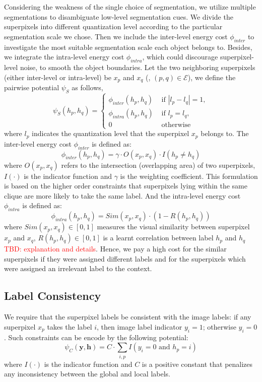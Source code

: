 Considering the weakness of the single choice of segmentation, we utilize multiple segmentations to disambiguate low-level segmentation cues. We divide the superpixels into different quantization level according to the particular segmentation scale we chose. Then we include the inter-level energy cost $\phi_{inter}$ to investigate the most suitable segmentation scale each object belongs to. Besides, we integrate the intra-level energy cost $\phi_{intra}$, which could discourage superpixel-level noise, to smooth the object boundaries. Let the two neighboring superpixels (either inter-level or intra-level) be $x_p$ and $x_q$ (\ie, $(p,q) \in \mathcal{E}$), we define the pairwise potential $\psi_S$ as follows,
\begin{equation}
    \psi_{S}(h_p,h_q) =
    \begin{cases}
        \phi_{inter}(h_p,h_q) &\mbox{ if } | l_p - l_q | = 1,
        \\
        \phi_{intra}(h_p,h_q) &\mbox{ if } l_p = l_q,
        \\
        0 &\mbox{ otherwise }
    \end{cases}
\end{equation}
where $l_p$ indicates the quantization level that the superpixel $x_p$ belongs to.
The inter-level energy cost $\phi_{inter}$ is defined as:
\begin{equation}
    \phi_{inter}(h_p,h_q) = \gamma \cdot O(x_p,x_q) \cdot I(h_p \neq h_q)
\end{equation}
where $O(x_p,x_q)$ refers to the intersection (overlapping area) of two superpixels, $I(\cdot)$ is the indicator function and $\gamma$ is the weighting coefficient. This formulation is based on the higher order constraints \cite{kohli2009robust,ladicky2009associative} that superpixels lying within the same clique are more likely to take the same label.
And the intra-level energy cost $\phi_{intra}$ is defined as:
\begin{equation}
    \phi_{intra}(h_p,h_q) = Sim(x_p,x_q) \cdot (1-R(h_p,h_q))
\end{equation}
where $Sim(x_p,x_q) \in [0,1]$ measures the visual similarity between superpixel $x_p$ and $x_q$, $R(h_p,h_q) \in [0,1]$ is a learnt correlation between label $h_p$ and $h_q$ {\textcolor{red}{TBD: explanation and details}}. Hence, we pay a high cost for the similar superpixels if they were assigned different labels and for the superpixels which were assigned an irrelevant label to the context.

\subsection{Label Consistency}
We require that the superpixel labels be consistent with the image labels: if any superpixel $x_p$ takes the label $i$, then image label indicator $y_i=1$; otherwise $y_i=0$. Such constraints can be encode by the following potential:
\begin{equation}
    \psi_{C}(\boldsymbol{y},\boldsymbol{h}) =
    C \cdot \sum_{i,p} I(y_i=0 \mbox{ and } h_p=i)
\end{equation}
where $I(\cdot)$ is the indicator function and $C$ is a positive constant that penalizes any inconsistency between the global and local labels.

